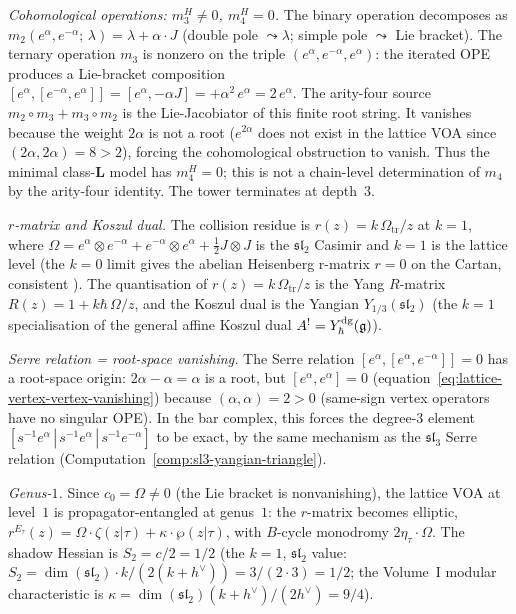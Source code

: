 \begin{computation}
\smallskip
\noindent
\emph{Cohomological operations: $m_3^H \ne 0$, $m_4^H = 0$.}
The binary operation decomposes as
$m_2(e^\alpha, e^{-\alpha};\, \lambda)
= \lambda + \alpha \cdot J$
(double pole $\leadsto \lambda$; simple pole $\leadsto$ Lie bracket).
The ternary operation $m_3$ is nonzero on the triple
$(e^\alpha, e^{-\alpha}, e^\alpha)$: the iterated OPE
produces a Lie-bracket composition
$[e^\alpha, [e^{-\alpha}, e^\alpha]] = [e^\alpha, -\alpha J]
= +\alpha^2\, e^\alpha = 2\, e^\alpha$.
The arity-four source \(m_2\circ m_3+m_3\circ m_2\) is the
Lie-Jacobiator of this finite root string.  It vanishes because the
weight $2\alpha$ is not a root
($e^{2\alpha}$ does not exist in the lattice VOA
since $(2\alpha, 2\alpha) = 8 > 2$), forcing the
cohomological obstruction to vanish.  Thus the minimal
class-\(\mathbf{L}\) model has \(m_4^H=0\); this is not a chain-level determination of
\(m_4\) by the arity-four identity. The tower terminates at depth~$3$.

\smallskip
\noindent
\emph{$r$-matrix and Koszul dual.}
The collision residue is
$r(z) = k\,\Omega_{\mathrm{tr}}/z$ at $k = 1$, where
$\Omega = e^\alpha \otimes e^{-\alpha}
+ e^{-\alpha} \otimes e^{\alpha}
+ \tfrac{1}{2} J \otimes J$
is the $\mathfrak{sl}_2$ Casimir and $k = 1$ is the
lattice level (the $k = 0$ limit gives the abelian
Heisenberg r-matrix $r = 0$ on the Cartan, consistent
).
The quantisation of $r(z) = k\,\Omega_{\mathrm{tr}}/z$ is the
Yang $R$-matrix $R(z) = 1 + k\hbar\,\Omega/z$,
and the Koszul dual is the Yangian
$Y_{1/3}(\mathfrak{sl}_2)$
(the $k = 1$ specialisation of the general affine
Koszul dual
$A^! = Y_\hbar^{\mathrm{dg}}(\mathfrak{g})$).

\smallskip
\noindent
\emph{Serre relation = root-space vanishing.}
The Serre relation $[e^\alpha, [e^\alpha, e^{-\alpha}]] = 0$
has a root-space origin: $2\alpha - \alpha = \alpha$ is a root,
but $[e^\alpha, e^\alpha] = 0$
(equation~\eqref{eq:lattice-vertex-vertex-vanishing})
because $(\alpha, \alpha) = 2 > 0$ (same-sign vertex
operators have no singular OPE). In the bar complex,
this forces the degree-$3$ element
$[s^{-1}e^\alpha\,|\,s^{-1}e^\alpha\,|\,s^{-1}e^{-\alpha}]$
to be exact, by the same mechanism as the $\mathfrak{sl}_3$
Serre relation
(Computation~\ref{comp:sl3-yangian-triangle}).

\smallskip
\noindent
\emph{Genus-$1$.}
Since $c_0 = \Omega \ne 0$ (the Lie bracket is
nonvanishing), the lattice VOA at level~$1$ is
propagator-entangled at genus~$1$: the $r$-matrix
becomes elliptic,
$r^{E_\tau}(z) = \Omega \cdot \zeta(z|\tau) + \kappa \cdot \wp(z|\tau)$,
with $B$-cycle monodromy $2\eta_\tau \cdot \Omega$.
The shadow Hessian is $S_2 = c/2 = 1/2$
(the $k = 1$, $\mathfrak{sl}_2$ value:
$S_2 = \dim(\mathfrak{sl}_2)\cdot k/(2(k+h^\vee)) = 3/(2 \cdot 3) = 1/2$;
the Volume~I modular characteristic is
$\kappa = \dim(\mathfrak{sl}_2)(k+h^\vee)/(2h^\vee) = 9/4$).
\end{computation}

